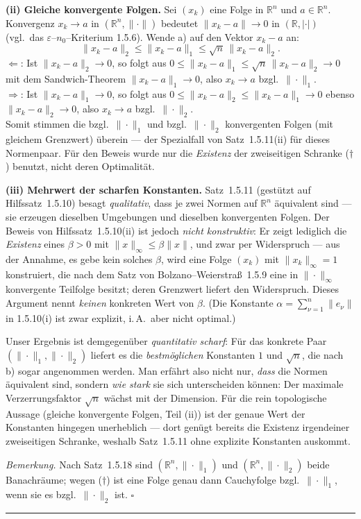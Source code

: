 \documentclass[a4paper,11pt]{article}
\begin{document}
\textbf{(ii) Gleiche konvergente Folgen.} Sei $(x_k)$ eine Folge in $\mathbb{R}^n$ und $a\in\mathbb{R}^n$. Konvergenz $x_k\to a$ in $(\mathbb{R}^n,\|\cdot\|)$ bedeutet $\|x_k-a\|\to 0$ in $(\mathbb{R},|\cdot|)$ (vgl.\ das $\varepsilon$--$n_0$--Kriterium 1.5.6). Wende a) auf den Vektor $x_k-a$ an:
\[
\|x_k-a\|_2\le\|x_k-a\|_1\le\sqrt{n}\,\|x_k-a\|_2. \tag{$\dagger$}
\]
\glqq$\Leftarrow$\grqq{}: Ist $\|x_k-a\|_2\to 0$, so folgt aus $0\le\|x_k-a\|_1\le\sqrt{n}\,\|x_k-a\|_2\to 0$ mit dem Sandwich-Theorem $\|x_k-a\|_1\to 0$, also $x_k\to a$ bzgl.\ $\|\cdot\|_1$.\\
\glqq$\Rightarrow$\grqq{}: Ist $\|x_k-a\|_1\to 0$, so folgt aus $0\le\|x_k-a\|_2\le\|x_k-a\|_1\to 0$ ebenso $\|x_k-a\|_2\to 0$, also $x_k\to a$ bzgl.\ $\|\cdot\|_2$.\\
Somit stimmen die bzgl.\ $\|\cdot\|_1$ und bzgl.\ $\|\cdot\|_2$ konvergenten Folgen (mit gleichem Grenzwert) überein --- der Spezialfall von Satz~1.5.11(ii) für dieses Normenpaar. Für den Beweis wurde nur die \emph{Existenz} der zweiseitigen Schranke ($\dagger$) benutzt, nicht deren Optimalität.

\textbf{(iii) Mehrwert der scharfen Konstanten.} Satz~1.5.11 (gestützt auf Hilfssatz~1.5.10) besagt \emph{qualitativ}, dass je zwei Normen auf $\mathbb{R}^n$ äquivalent sind --- sie erzeugen dieselben Umgebungen und dieselben konvergenten Folgen. Der Beweis von Hilfssatz~1.5.10(ii) ist jedoch \emph{nicht konstruktiv}: Er zeigt lediglich die \emph{Existenz} eines $\beta>0$ mit $\|x\|_\infty\le\beta\|x\|$, und zwar per Widerspruch --- aus der Annahme, es gebe kein solches $\beta$, wird eine Folge $(x_k)$ mit $\|x_k\|_\infty=1$ konstruiert, die nach dem Satz von Bolzano--Weierstraß~1.5.9 eine in $\|\cdot\|_\infty$ konvergente Teilfolge besitzt; deren Grenzwert liefert den Widerspruch. Dieses Argument nennt \emph{keinen} konkreten Wert von $\beta$. (Die Konstante $\alpha=\sum_{\nu=1}^n\|e_\nu\|$ in 1.5.10(i) ist zwar explizit, i.\,A.\ aber nicht optimal.)

Unser Ergebnis ist demgegenüber \emph{quantitativ scharf}: Für das konkrete Paar $(\|\cdot\|_1,\|\cdot\|_2)$ liefert es die \emph{bestmöglichen} Konstanten $1$ und $\sqrt{n}$, die nach b) sogar angenommen werden. Man erfährt also nicht nur, \emph{dass} die Normen äquivalent sind, sondern \emph{wie stark} sie sich unterscheiden können: Der maximale \glqq Verzerrungsfaktor\grqq{} $\sqrt{n}$ wächst mit der Dimension. Für die rein topologische Aussage (gleiche konvergente Folgen, Teil (ii)) ist der genaue Wert der Konstanten hingegen unerheblich --- dort genügt bereits die Existenz irgendeiner zweiseitigen Schranke, weshalb Satz~1.5.11 ohne explizite Konstanten auskommt.

\emph{Bemerkung.} Nach Satz~1.5.18 sind $(\mathbb{R}^n,\|\cdot\|_1)$ und $(\mathbb{R}^n,\|\cdot\|_2)$ beide Banachräume; wegen ($\dagger$) ist eine Folge genau dann Cauchyfolge bzgl.\ $\|\cdot\|_1$, wenn sie es bzgl.\ $\|\cdot\|_2$ ist. $\square$\par\bigskip\hrule\bigskip
\end{document}
